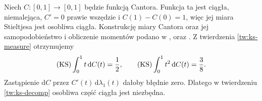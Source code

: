 \begin{przyklad}
Niech $C:[0,1]\to[0,1]$ będzie funkcją Cantora. Funkcja ta jest ciągła, niemalejąca, $C'=0$ prawie wszędzie i $C(1)-C(0)=1$, więc jej miara Stieltjesa jest osobliwa ciągła. Konstrukcję miary Cantora oraz jej samopodobieństwo
i obliczenie momentów podano w
,
oraz .
Z twierdzenia \ref{tw:ks-measure} otrzymujemy
\[
 (\mathrm{KS})\int_0^1 t\,\mathrm dC(t)=\frac12,\qquad
 (\mathrm{KS})\int_0^1 t^2\,\mathrm dC(t)=\frac38.
\]
Zastąpienie $\mathrm dC$ przez
$C'(t)\,\mathrm d\lambda_1(t)$ dałoby błędnie zero.
Dlatego w twierdzeniu \ref{tw:ks-decomp}
osobliwa część ciągła jest niezbędna.
\end{przyklad}


